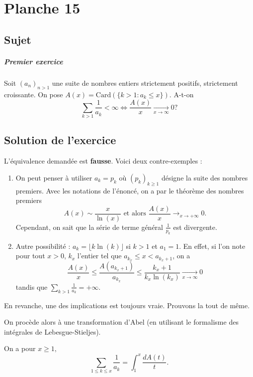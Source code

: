 \chapter{Planche 15}

\section{Sujet}

\paragraph{Premier exercice}
Soit $(a_n)_{n>1}$ une suite de nombres entiers strictement positifs, strictement croissante. On pose $A(x) = \mathrm{Card}(\{k > 1 : a_{k} \leqslant  x\})$. A-t-on \[\sum _{k>1} \frac{1}{a_{k}} <\infty  \Longleftrightarrow  \frac{A(x)}{x} \xrightarrow[x\rightarrow \infty ]{} 0 ?\]

\section{Solution de l'exercice}

L'équivalence demandée est \textbf{fausse}. Voici deux contre-exemples :
\begin{enumerate}
    \item On peut penser à utiliser $a_{k}=p_{k}$ où $\displaystyle (p_{k})_{k\geq 1}$ désigne la suite des nombres premiers. Avec les notations de l'énoncé, on a par le théorème des nombres premiers $$A(x)\sim \frac{x}{\ln(x)} \mbox{ et alors } \frac{A(x)}{x}\longrightarrow_{x\rightarrow +\infty} 0.$$
    Cependant, on sait que la série de terme général $\displaystyle \frac{1}{p_{k}}$ est divergente.
    \item Autre possibilité : $a_k = \lfloor k \ln(k)\rfloor$ si $k>1$ et $a_1=1$. En effet, si l'on note pour tout $x>0$, $k_x$ l'entier tel que $a_{k_x}\leqslant x <a_{k_x+1}$, on a \[\frac{A(x)}{x} \leqslant \frac{A(a_{k_x+1})}{a_{k_x}} \leqslant \frac{k_x+1}{k_x\ln(k_x)} \xrightarrow[x\rightarrow \infty ]{} 0\]
    tandis que $\displaystyle \sum_{k>1} \frac1{a_k} =+\infty$.
\end{enumerate}

En revanche, une des implications est toujours vraie. Prouvons la tout de même.

On procède alors à une transformation d'Abel (en utilisant le formalisme des intégrales de Lebesgue-Stieljes).

On a pour $x\geq 1,$
$$\sum_{1\leq k\leq x}\frac{1}{a_{k}} = \int_{1}^{x}\frac{dA(t)}{t}.$$

